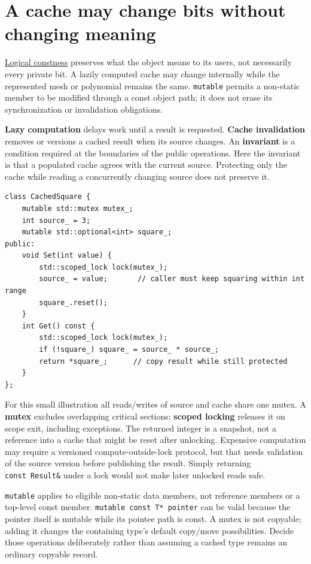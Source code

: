 \section{A cache may change bits without changing meaning}\label{05-engine-i-ch003-a-cache-may-change-bits-without-changing-meaning}

\hyperref[appendix-f5593256bcaf]{Logical constness} preserves what the object means to its users, not necessarily every private bit. A lazily computed cache may change internally while the represented mesh or polynomial remains the same. \texttt{mutable} permits a non-static member to be modified through a const object path; it does not erase its synchronization or invalidation obligations.

\textbf{Lazy computation} delays work until a result is requested. \textbf{Cache invalidation} removes or versions a cached result when its source changes. An \textbf{invariant} is a condition required at the boundaries of the public operations. Here the invariant is that a populated cache agrees with the current source. Protecting only the cache while reading a concurrently changing source does not preserve it.

\begin{verbatim}
class CachedSquare {
    mutable std::mutex mutex_;
    int source_ = 3;
    mutable std::optional<int> square_;
public:
    void Set(int value) {
        std::scoped_lock lock(mutex_);
        source_ = value;       // caller must keep squaring within int range
        square_.reset();
    }
    int Get() const {
        std::scoped_lock lock(mutex_);
        if (!square_) square_ = source_ * source_;
        return *square_;      // copy result while still protected
    }
};
\end{verbatim}

For this small illustration all reads/writes of source and cache share one mutex. A \textbf{mutex} excludes overlapping critical sections; \textbf{scoped locking} releases it on scope exit, including exceptions. The returned integer is a snapshot, not a reference into a cache that might be reset after unlocking. Expensive computation may require a versioned compute-outside-lock protocol, but that needs validation of the source version before publishing the result. Simply returning \texttt{const\ Result\&} under a lock would not make later unlocked reads safe.

\texttt{mutable} applies to eligible non-static data members, not reference members or a top-level const member. \texttt{mutable\ const\ T*\ pointer} can be valid because the pointer itself is mutable while its pointee path is const. A mutex is not copyable; adding it changes the containing type's default copy/move possibilities. Decide those operations deliberately rather than assuming a cached type remains an ordinary copyable record.

